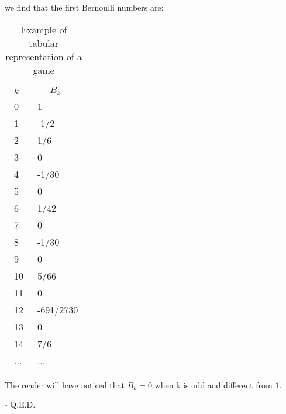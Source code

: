 \begin{dem}
		we find that the first Bernoulli numbers are:
		\begin{table}[H]
			\begin{center}
			\begin{tabular}{|p{1cm}|p{2.5cm}|}
					\hline
					\multicolumn{1}{c}{\cellcolor{black!30}\textbf{$k$}} & 
  \multicolumn{1}{c}{\cellcolor{black!30}\textbf{$B_k$}} \\ \hline
					\centering\arraybackslash\ 0 & \centering\arraybackslash\ 1 \\ \hline
					\centering\arraybackslash\ 1 & \centering\arraybackslash\ -1/2 \\ \hline
					\centering\arraybackslash\ 2 & \centering\arraybackslash\ 1/6  \\ \hline
					\centering\arraybackslash\ 3 & \centering\arraybackslash\ 0  \\ \hline
					\centering\arraybackslash\ 4 & \centering\arraybackslash\ -1/30  \\ \hline
					\centering\arraybackslash\ 5 & \centering\arraybackslash\ 0  \\ \hline
					\centering\arraybackslash\ 6 & \centering\arraybackslash\ 1/42  \\ \hline
					\centering\arraybackslash\ 7 & \centering\arraybackslash\ 0  \\ \hline
					\centering\arraybackslash\ 8 & \centering\arraybackslash\ -1/30  \\ \hline
					\centering\arraybackslash\ 9 & \centering\arraybackslash\ 0  \\ \hline
					\centering\arraybackslash\ 10 & \centering\arraybackslash\ 5/66  \\ \hline
					\centering\arraybackslash\ 11 & \centering\arraybackslash\ 0  \\ \hline
					\centering\arraybackslash\ 12 & \centering\arraybackslash\ -691/2730  \\ \hline
					\centering\arraybackslash\ 13 & \centering\arraybackslash\ 0  \\ \hline
					\centering\arraybackslash\ 14 & \centering\arraybackslash\ 7/6  \\ \hline
					\centering\arraybackslash\ ... & \centering\arraybackslash\ $...$  \\ \hline
			\end{tabular}
			\end{center}
			\caption{Example of tabular representation of a game}
		\end{table}	
		The reader will have noticed that $B_k=0$ when k is odd and different from $1$.
		\begin{flushright}
			$\square$  Q.E.D.
		\end{flushright}
	\end{dem}
